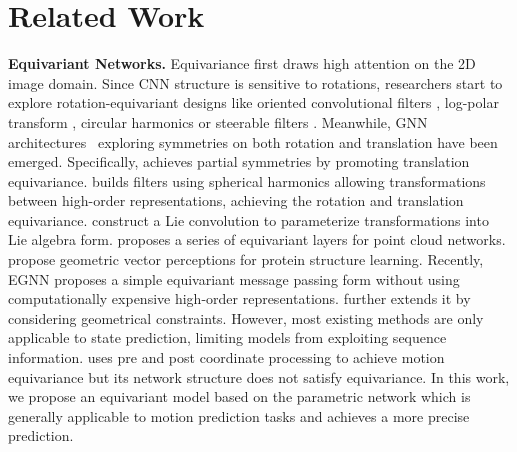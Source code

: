 \documentclass[10pt,twocolumn,letterpaper]{article}
\begin{document}
\section{Related Work}
\vspace{-1mm}
\textbf{Equivariant Networks.} Equivariance first draws high attention on the 2D image domain. Since CNN structure is sensitive to rotations, researchers start to explore rotation-equivariant designs like oriented convolutional filters \cite{cohen2016group,marcos2017rotation}, log-polar transform \cite{esteves2017polar}, circular harmonics \cite{worrall2017harmonic} or steerable filters \cite{weiler2018learning}. Meanwhile, GNN architectures~\cite{yang2020CVPR,yang2020NeurIPS,yang2022deep} exploring symmetries on both rotation and translation have been emerged. Specifically, \cite{ummenhofer2019lagrangian,sanchez2020learning} achieves partial symmetries by promoting translation equivariance. \cite{thomas2018tensor,fuchs2020se} builds filters using spherical harmonics allowing transformations between high-order representations, achieving the rotation and translation equivariance. 
\cite{finzi2020generalizing,hutchinson2021lietransformer} construct a Lie convolution to parameterize transformations into Lie algebra form. \cite{deng2021vector} proposes a series of equivariant layers for point cloud networks. \cite{jing2020learning} propose geometric vector perceptions for protein structure learning. Recently, EGNN \cite{satorras2021n} proposes a simple equivariant message passing form without using computationally expensive high-order representations. \cite{huang2022equivariant} further extends it by considering geometrical constraints. 
However, most existing methods are only applicable to state prediction, limiting 
models from exploiting sequence information. 
\cite{kofinas2021roto} uses pre and post coordinate processing to achieve motion equivariance but its network structure does not satisfy equivariance.
In this work, we propose an equivariant model based on the parametric network which is generally applicable to 
motion prediction tasks 
and achieves a more precise prediction.
\end{document}
